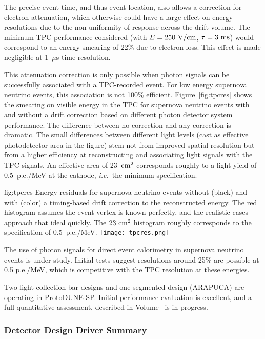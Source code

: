 The precise event time, and thus event location, also allows a 
correction for electron attenuation, which otherwise could have 
a large effect on energy resolutions due to the non-uniformity
of response across the drift volume.  
The minimum TPC performance 
considered (with $E=250~\rm{V/cm}$, $\tau=3~\rm{ms}$) would 
correspond to an energy smearing of 22\% due to electron loss.  
This effect is made negligible at 1~$\mu$s time resolution.

This attenuation correction is only possible when photon signals can be successfully associated with a TPC-recorded event.  For low energy supernova neutrino events, this association is not 
100\% efficient.  Figure~\ref{fig:tpcres} shows the smearing on visible energy in the TPC for supernova neutrino events with and without a drift correction based on different photon detector system performance.  The difference between no correction and any correction is dramatic.  The small differences between different light levels (cast as effective photodetector area in the figure) stem not from improved spatial resolution but from a higher efficiency at reconstructing and associating light signals with the TPC signals.  An effective area of 23~$\rm{cm}^2$ corresponds roughly to a light yield of 0.5~p.e./MeV at the cathode, {\em i.e.}\ the minimum specification.
%
\begin{dunefigure}
{fig:tpcres}
{Energy residuals for supernova neutrino events without (black) 
and with (color) a timing-based drift correction to the 
reconstructed energy.  The red histogram assumes the event 
vertex is known perfectly, and the realistic cases approach that
ideal quickly.  The $23~\rm{cm}^2$ histogram roughly corresponds 
to the specification of 0.5~p.e./MeV.}
  \texttt{[image: tpcres.png]}
\end{dunefigure}

The use of photon signals for direct event calorimetry in 
supernova neutrino events is under study. Initial tests suggest 
resolutions around 25\% are possible at 0.5 p.e./MeV, which is
competitive with the TPC resolution at these energies.

Two light-collection bar designs and one segmented design 
(ARAPUCA) are operating in ProtoDUNE-SP.  Initial performance 
evaluation is excellent, and a full quantitative assessment, 
described in Volume~\voltitlesp{} 
is in progress.

\subsubsection{Detector Design Driver Summary}

